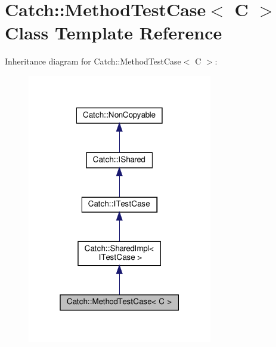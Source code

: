 \hypertarget{classCatch_1_1MethodTestCase}{}\section{Catch\+:\+:Method\+Test\+Case$<$ C $>$ Class Template Reference}
\label{classCatch_1_1MethodTestCase}


Inheritance diagram for Catch\+:\+:Method\+Test\+Case$<$ C $>$\+:\nopagebreak
\begin{figure}[H]
\begin{center}
\leavevmode
\includegraphics[width=229pt]{classCatch_1_1MethodTestCase__inherit__graph}
\end{center}
\end{figure}


